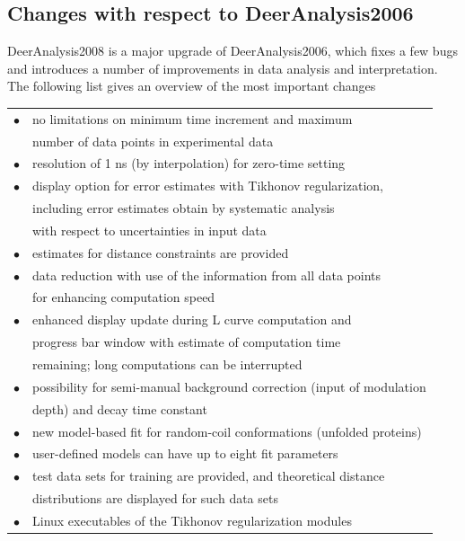 \documentclass{article}
\begin{document}
\subsection{Changes with respect to DeerAnalysis2006}
\label{changes_2006_1}

DeerAnalysis2008 is a major upgrade of DeerAnalysis2006, which fixes a few bugs and introduces a number of improvements in data analysis and interpretation. The following list gives an overview of the most important changes    

\begin{tabular}{ll}
\noalign{\smallskip}
$\bullet$ & no limitations on minimum time increment and maximum \\ & number of data points in experimental data\\
$\bullet$ & resolution of 1 ns (by interpolation) for zero-time setting \\
$\bullet$ & display option for error estimates with Tikhonov regularization, \\ & including error estimates obtain by systematic analysis \\ & with respect to uncertainties in input data \\
$\bullet$ & estimates for distance constraints are provided\\
$\bullet$ & data reduction with use of the information from all data points\\ & for enhancing computation speed\\
$\bullet$ & enhanced display update during L curve computation and \\ & progress bar window with estimate of computation time \\ & remaining; long computations can be interrupted\\
$\bullet$ & possibility for semi-manual background correction (input of modulation \\ & depth) and decay time constant\\
$\bullet$ & new model-based fit for random-coil conformations (unfolded proteins)\\
$\bullet$ & user-defined models can have up to eight fit parameters\\
$\bullet$ & test data sets for training are provided, and theoretical distance\\ & distributions are displayed for such data sets\\
$\bullet$ & Linux executables of the Tikhonov regularization modules\\
\end{tabular}
\end{document}
